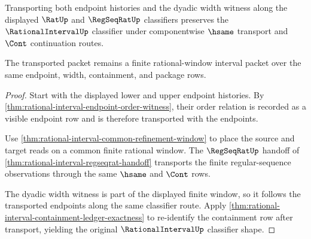 \begin{theorem}
\label{thm:rationalinterval-dyadic-transport-stability}
Transporting both endpoint histories and the dyadic width witness along the
displayed $\RatUp$ and $\RegSeqRatUp$ classifiers preserves the
$\RationalIntervalUp$ classifier under componentwise $\hsame$ transport and
$\Cont$ continuation routes.

The transported packet remains a finite rational-window interval packet over
the same endpoint, width, containment, and package rows.
\end{theorem}
\begin{proof}
Start with the displayed lower and upper endpoint histories. By
\autoref{thm:rational-interval-endpoint-order-witness}, their order relation is
recorded as a visible endpoint row and is therefore transported with the
endpoints.

Use \autoref{thm:rational-interval-common-refinement-window} to place the
source and target reads on a common finite rational window. The
$\RegSeqRatUp$ handoff of
\autoref{thm:rational-interval-regseqrat-handoff} transports the finite
regular-sequence observations through the same $\hsame$ and $\Cont$ rows.

The dyadic width witness is part of the displayed finite window, so it follows
the transported endpoints along the same classifier route. Apply
\autoref{thm:rational-interval-containment-ledger-exactness} to re-identify the
containment row after transport, yielding the original
$\RationalIntervalUp$ classifier shape.
\end{proof}

